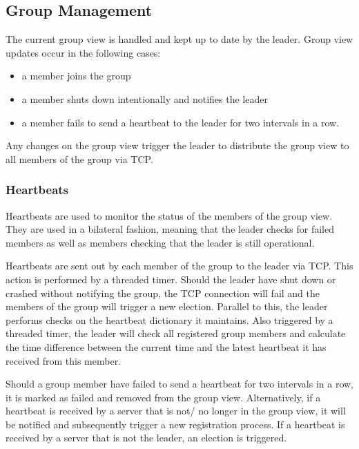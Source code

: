 \documentclass[runningheads]{llncs}
\begin{document}
\subsection{Group Management} \label{grpmngmnt}

The current group view is handled and kept up to date by the leader. Group view updates occur in the following cases:
\begin{itemize}
    \item a member joins the group
    \item a member shuts down intentionally and notifies the leader
    \item  a member fails to send a heartbeat to the leader for two intervals in a row.
\end{itemize}
Any changes on the group view trigger the leader to distribute the group view to all members of the group via TCP.

\subsubsection{Heartbeats} \label{heartbeats}

Heartbeats are used to monitor the status of the members of the group view. They are used in a bilateral fashion, meaning that the leader checks for failed members as well as members checking that the leader is still operational.

Heartbeats are sent out by each member of the group to the leader via TCP. This action is performed by a threaded timer. Should the leader have shut down or crashed without notifying the group, the TCP connection will fail and the members of the group will trigger a new election. Parallel to this, the leader performs checks on the heartbeat dictionary it maintains. Also triggered by a threaded timer, the leader will check all registered group members and calculate the time difference between the current time and the latest heartbeat it has received from this member.

Should a group member have failed to send a heartbeat for two intervals in a row, it is marked as failed and removed from the group view. Alternatively, if a heartbeat is received by a server that is not/ no longer in the group view, it will be notified and subsequently trigger a new registration process. If a heartbeat is received by a server that is not the leader, an election is triggered.
\end{document}

